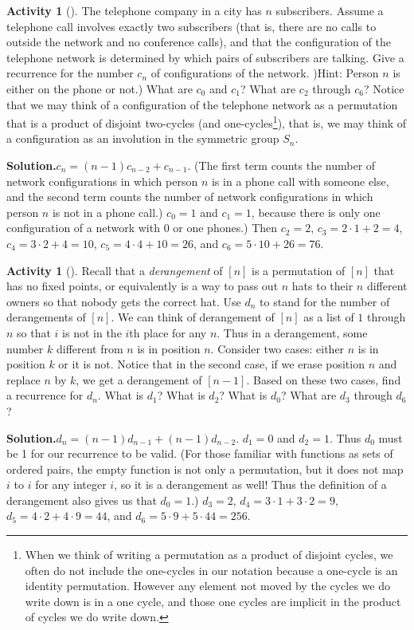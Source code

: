 \documentclass[10pt,]{book}
\theoremstyle{plain}
\theoremstyle{definition}
\newtheorem{activity}[project]{Activity}
\numberwithin{equation}{chapter}
\begin{document}
\begin{activity}[]\label{telephonenetwork}
The telephone company in a city has \(n\) subscribers. Assume a telephone call involves exactly two subscribers (that is, there are no calls to outside the network and no conference calls), and that the configuration of the telephone network is determined by which pairs of subscribers are talking. Give a recurrence for the number \(c_n\) of configurations of the network. )Hint: Person \(n\) is either on the phone or not.) What are \(c_0\) and \(c_1\)? What are \(c_2\) through \(c_6\)? Notice that we may think of a configuration of the telephone network as a permutation that is a product of disjoint two-cycles (and one-cycles\footnote{When we think of writing a permutation as a product of disjoint cycles, we often do not include the one-cycles in our notation because a one-cycle is an identity permutation.  However any element not moved by the cycles we do write down is in a one cycle, and those one cycles are implicit in the product of cycles we do write down.\label{fn-6}}), that is, we may think of a configuration as an involution in the symmetric group \(S_n\).%
\par\medskip\noindent%
\textbf{Solution.}\quad \(c_n =(n-1)c_{n-2} + c_{n-1}\). (The first term counts the number of network configurations in which person \(n\) is in a phone call with someone else, and the second term counts the number of network configurations in which person \(n\) is not in a phone call.) \(c_0 =1\) and \(c_1=1\), because there is only one configuration of a network with 0 or one phones.) Then \(c_2 =2\), \(c_3 =2\cdot1 +2=4\), \(c_4= 3\cdot2+4=10\), \(c_5= 4\cdot4 +10 = 26\), and \(c_6 = 5\cdot 10+26=76\).%
\end{activity}
\begin{activity}[]\label{derangementrecurrence}
Recall that a \emph{derangement} of \([n]\) is a permutation of \([n]\) that has no fixed points, or equivalently is a way to pass out \(n\) hats to their \(n\) different owners so that nobody gets the correct hat. Use \(d_n\) to stand for the number of derangements of \([n]\). We can think of derangement of \([n]\) as a list of \(1\) through \(n\) so that \(i\) is not in the \(i\)th place for any \(n\). Thus in a derangement, some number \(k\) different from \(n\) is in position \(n\). Consider two cases: either \(n\) is in position \(k\) or it is not. Notice that in the second case, if we erase position \(n\) and replace \(n\) by \(k\), we get a derangement of \([n-1]\). Based on these two cases, find a recurrence for \(d_n\). What is \(d_1\)? What is \(d_2\)? What is \(d_0\)? What are \(d_3\) through \(d_6\)?%
\par\medskip\noindent%
\textbf{Solution.}\quad \(d_n = (n-1)d_{n-1} + (n-1)d_{n-2}\). \(d_1 = 0\) and \(d_2 = 1\). Thus \(d_0\) must be 1 for our recurrence to be valid. (For those familiar with functions as sets of ordered pairs, the empty function is not only a permutation, but it does not map \(i\) to \(i\) for any integer \(i\), so it is a derangement as well! Thus the definition of a derangement also gives us that \(d_0=1\).) \(d_3= 2\), \(d_4=3\cdot1+3\cdot 2=9\), \(d_5=4\cdot2+4\cdot 9 = 44\), and \(d_6 = 5\cdot9+5\cdot44 = 256\).%
\end{activity}
\end{document}
